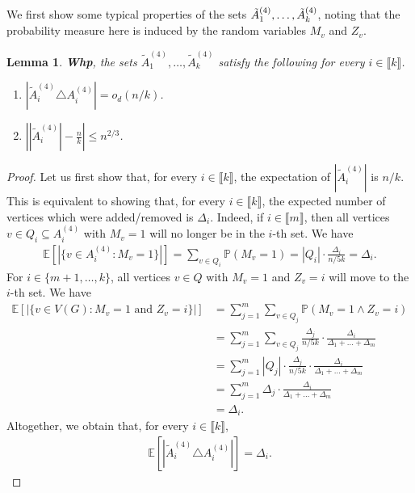 \documentclass[notitlepage]{scrartcl}
\newcommand{\br}[1]{\llbracket{#1}\rrbracket}
\newtheorem{lemma}[thm]{Lemma}
\renewcommand{\Pr}{\mathbb{P}}
\begin{document}
We first show some typical properties of the sets $\Tilde{A}_1^{(4)},\ldots, \Tilde{A}_k^{(4)}$, noting that the probability measure here is induced by the random variables $M_v$ and $Z_v$.
\begin{lemma}\label{l: typical aht properties}
\textbf{Whp}, the sets $\tilde{A}_1^{(4)},\ldots, \tilde{A}_k^{(4)}$ satisfy the following for every $i\in \br{k}$.
\begin{enumerate}
    \item $\left|\tilde{A}_i^{(4)}\triangle A_i^{(4)}\right|=o_d(n/k)$.
    \item $\left||\tilde{A}_i^{(4)}|-\frac{n}{k}\right|\le n^{2/3}$.
\end{enumerate}
\end{lemma}
\begin{proof}
Let us first show that, for every $i \in \br{k}$, the expectation of $|\tilde{A}_i^{(4)}|$ is $n/k$. This is equivalent to showing that, for every $i \in \br{k}$, the expected number of vertices which were added/removed is $\Delta_i$. Indeed, if $i \in \br{m}$, then all vertices $v\in Q_i\subseteq A_i^{(4)}$ with $M_v=1$ will no longer be in the $i$-th set. We have
\begin{align*}
    \mathbb{E}[|\{v \in A_i^{(4)} \colon M_v = 1\}|] = \sum_{v \in Q_i} \Pr(M_v = 1) = |Q_i| \cdot \frac{\Delta_i}{n/5k} = \Delta_i.
\end{align*}
For $i \in \{m+1,\ldots,k\}$, all vertices $v\in Q$ with $M_v=1$ and $Z_v=i$ will move to the $i$-th set. We have
\begin{align*}
    \mathbb{E}[|\{v \in V(G) \colon M_v = 1 \text{ and } Z_v = i\}|] &= \sum_{j=1}^{m} \sum_{v \in Q_j} \Pr(M_v = 1 \wedge Z_v = i)\\& = \sum_{j=1}^{m} \sum_{v \in Q_j} \frac{\Delta_j}{n/5k} \cdot \frac{\Delta_i}{\Delta_1 + \dots + \Delta_m} \\
    &= \sum_{j=1}^{m} |Q_j| \cdot \frac{\Delta_j}{n/5k} \cdot \frac{\Delta_i}{\Delta_1 + \dots + \Delta_m} \\&= \sum_{j=1}^{m} \Delta_j \cdot \frac{\Delta_i}{\Delta_1 + \dots + \Delta_m} \\
    &= \Delta_i.
\end{align*}
Altogether, we obtain that, for every $i \in \br{k}$,
\begin{align}
\mathbb{E}\left[\left|\tilde{A}_i^{(4)}\triangle A_i^{(4)}\right|\right] = \Delta_i. \label{eq: deltai expect}
\end{align}


\end{proof}
\end{document}
